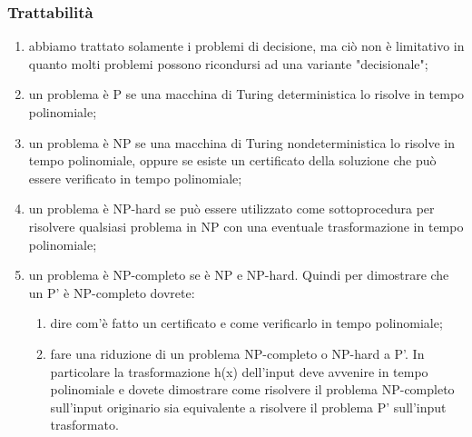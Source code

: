 \documentclass[a4paper,11pt]{article}
\begin{document}
\subsubsection{Trattabilità}
\begin{enumerate}
    \item abbiamo trattato solamente i problemi di decisione, ma ciò non è limitativo in quanto molti problemi possono ricondursi ad una variante "decisionale";
    \item un problema è P se una macchina di Turing deterministica lo risolve in tempo polinomiale;
    \item un problema è NP se una macchina di Turing nondeterministica lo risolve in tempo polinomiale, oppure se esiste un certificato della soluzione che può essere verificato in tempo polinomiale;
    \item un problema è NP-hard se può essere utilizzato come sottoprocedura per risolvere qualsiasi problema in NP con una eventuale trasformazione in tempo polinomiale;
    \item un problema è NP-completo se è NP e NP-hard. Quindi per dimostrare che un P' è NP-completo dovrete:
    \begin{enumerate}
        \item dire com'è fatto un certificato e come verificarlo in tempo polinomiale;
        \item fare una riduzione di un problema NP-completo o NP-hard a P'. In particolare la trasformazione h(x) dell'input deve avvenire in tempo polinomiale e dovete dimostrare come risolvere il problema NP-completo sull'input originario sia equivalente a risolvere il problema P' sull'input trasformato.
    \end{enumerate}
\end{enumerate}



\end{document}
